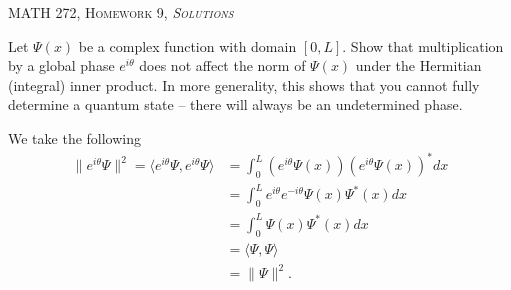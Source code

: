 \documentclass[12pt]{article} %
\newcommand{\innprod}[2]{\langle #1, #2 \rangle}
\begin{document}
\begin{center}
   \textsc{\large MATH 272, Homework 9, \emph{Solutions}}\\
\end{center}
\vspace{.5cm}

\begin{problem}
	Let $\Psi(x)$ be a complex function with domain $[0,L]$.  Show that multiplication by a global phase $e^{i\theta}$ does not affect the norm of $\Psi(x)$ under the Hermitian (integral) inner product. In more generality, this shows that you cannot fully determine a quantum state -- there will always be an undetermined phase.
\end{problem}
\begin{solution}
	We take the following
	\begin{align*}
		\|e^{i\theta} \Psi\|^2=\innprod{e^{i\theta}\Psi}{e^{i\theta}\Psi} &= \int_0^L \left(e^{i\theta}\Psi(x)\right)\left(e^{i\theta}\Psi(x)\right)^*dx\\
		&= \int_0^L e^{i\theta}e^{-i\theta} \Psi(x)\Psi^*(x)dx\\
		&= \int_0^L \Psi(x)\Psi^*(x)dx\\
		&= \innprod{\Psi}{\Psi}\\
		&= \|\Psi\|^2.
	\end{align*}
\end{solution}
\end{document}
